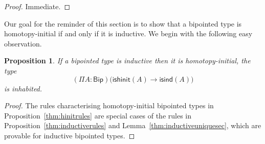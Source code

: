 \documentclass[10pt,a4paper,oneside,reqno]{amsart}
\numberwithin{equation}{section}
\theoremstyle{mythm}
\newtheorem{proposition}[theorem]{Proposition}
\theoremstyle{mydef}
\theoremstyle{myrmk}
\newcommand{\ie}{\text{i.e.\ }}
\newcommand{\co}{\colon}
\newcommand{\Bip}{\mathsf{Bip}}
\newcommand{\ishinit}{\mathsf{ishinit}}
\newcommand{\isind}{\mathsf{isind}}
\begin{document}
\begin{proof} Immediate.
\end{proof} 







Our goal for the reminder of this section is to show that a bipointed type is homotopy-initial if and only
if it is inductive. We begin with the following easy observation.




\begin{proposition} \label{thm:indrec}
If a bipointed type is inductive then it is homotopy-initial, \ie the type
\[
(\Pi A \co \Bip) \big(  \ishinit(A) \rightarrow \isind(A) \big)
\] 
is inhabited.
\end{proposition}


\begin{proof} The rules characterising homotopy-initial bipointed types in Proposition~\ref{thm:hinitrules}
are special cases of the rules in Proposition~\ref{thm:inductiverules} and Lemma~\ref{thm:inductiveuniquesec},
which are provable for inductive bipointed types.
\end{proof}
\end{document}
